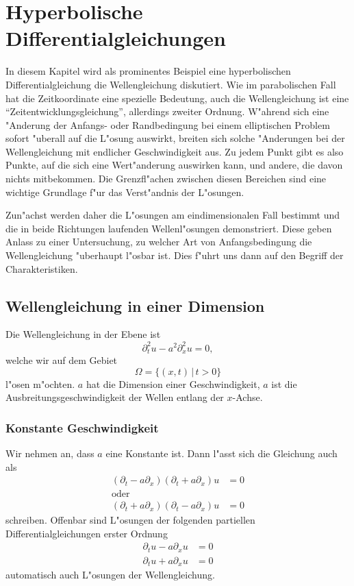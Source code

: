 %
%
%
\chapter{Hyperbolische Differentialgleichungen\label{chapter-hyperbolisch}}
\rhead{}
In diesem Kapitel wird als prominentes Beispiel eine hyperbolischen
Differentialgleichung die Wellengleichung diskutiert.
Wie im parabolischen Fall hat die Zeitkoordinate eine spezielle Bedeutung,
auch die Wellengleichung ist eine ``Zeitentwicklungsgleichung'', allerdings
zweiter Ordnung. W"ahrend sich eine "Anderung der Anfangs- oder Randbedingung
bei einem elliptischen Problem sofort "uberall auf die L"osung auswirkt,
breiten sich solche "Anderungen bei der Wellengleichung mit endlicher
Geschwindigkeit aus. Zu jedem Punkt gibt es also Punkte, auf die sich eine
Wert"anderung auswirken kann, und andere, die davon nichts mitbekommen.
Die Grenzfl"achen zwischen diesen Bereichen sind eine wichtige Grundlage
f"ur das Verst"andnis der L"osungen.

Zun"achst werden daher die L"osungen 
am eindimensionalen Fall bestimmt und die in beide Richtungen laufenden 
Wellenl"osungen demonstriert. Diese geben Anlass zu einer Untersuchung,
zu welcher Art von Anfangsbedingung die Wellengleichung "uberhaupt
l"osbar ist. Dies f"uhrt uns dann auf den Begriff der Charakteristiken.

\section{Wellengleichung in einer Dimension}
Die Wellengleichung in der Ebene ist
\[
\partial_t^2u-a^2\partial_x^2u=0,
\]
welche wir auf dem Gebiet
\[
\Omega = \{(x,t) \,|\, t > 0\}
\]
l"osen m"ochten.
$a$ hat die Dimension einer Geschwindigkeit, $a$ ist die
Ausbreitungsgeschwindigkeit der Wellen entlang der $x$-Achse.

\subsection{Konstante Geschwindigkeit}
Wir nehmen an, dass $a$ eine Konstante ist. Dann l"asst sich die Gleichung
auch als
\begin{align*}
(\partial_t -a\partial_x)(\partial_t+a\partial_x)u&=0
\\
\text{oder}&
\\
(\partial_t +a\partial_x)(\partial_t-a\partial_x)u&=0
\end{align*}
schreiben.
Offenbar sind L"osungen der folgenden partiellen Differentialgleichungen
erster Ordnung
\begin{align}
\partial_t u-a\partial_x u&=0
\label{wellelinks}
\\
\partial_t u+a\partial_x u&=0
\label{wellerechts}
\end{align}
automatisch auch L"osungen der Wellengleichung.


